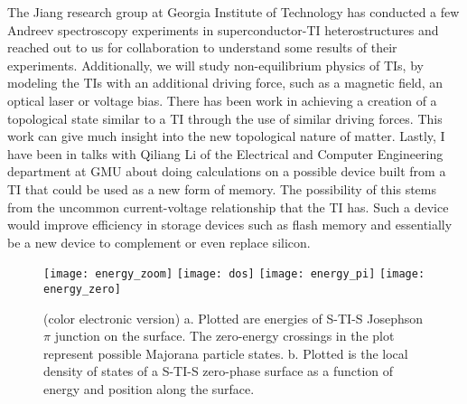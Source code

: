 \documentclass[12pt,twocolumn]{article}
\begin{document}
The Jiang research group at Georgia Institute of Technology has conducted a few Andreev spectroscopy experiments in superconductor-TI heterostructures and reached out to us for collaboration to understand some results of their experiments. Additionally, we will study non-equilibrium physics of TIs, by modeling the TIs with an additional driving force, such as a magnetic field, an optical laser or voltage bias. There has been work in achieving a creation of a topological state similar to a TI through the use of similar driving forces. This work can give much insight into the new topological nature of matter. Lastly, I have been in talks with Qiliang Li of the Electrical and Computer Engineering department at GMU about doing calculations on a possible device built from a TI that could be used as a new form of memory. The possibility of this stems from the uncommon current-voltage relationship that the TI has. Such a device would improve efficiency in storage devices such as flash memory and essentially be a new device to complement or even replace silicon.
\begin{figure}[ht]

\texttt{[image: energy\_zoom]}
\texttt{[image: dos]}
\texttt{[image: energy\_pi]}
\texttt{[image: energy\_zero]}

\caption{(color electronic version) a. Plotted are energies of S-TI-S Josephson $\pi$ junction on the surface. The zero-energy crossings in the plot represent possible Majorana particle states. b. Plotted is the local density of states of a S-TI-S zero-phase surface as a function of energy and position along the surface. 
}\label{setup}
\end{figure}
\end{document}

